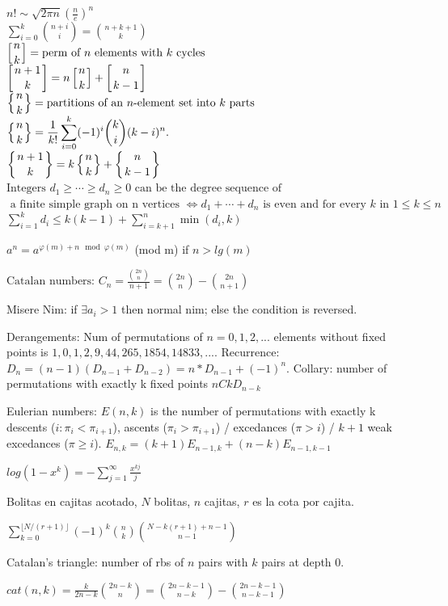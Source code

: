 $\displaystyle n!\sim {\sqrt {2\pi n}}\left({\frac {n}{e}}\right)^{n}$ \\
$\displaystyle \sum \limits_{i= 0}^k{n+i \choose i} = {n+k+1 \choose k}$ \\
${\displaystyle \left[{n \atop k}\right]} =\text{perm of }n \text{ elements with } k \text{ cycles}$ \\
${\displaystyle \left[{n+1 \atop k}\right]=n\left[{n \atop k}\right]+\left[{n \atop k-1}\right]}$ \\
${\displaystyle \left\{{n \atop k}\right\}}= \text{partitions of an }n\text{-element set into } k \text{ parts}$ \\
${\displaystyle \left\{{n \atop k}\right\}={\frac {1}{k!}}\sum _{i=0}^{k}(-1)^{i}{\binom {k}{i}}(k-i)^{n}.}$ \\
${\displaystyle \left\{{n+1 \atop k}\right\}=k\left\{{n \atop k}\right\}+\left\{{n \atop k-1}\right\}}$ \\
$\text {Integers } d_{1}\geq \cdots \geq d_{n} \geq 0 \text { can be the degree sequence of }$ \\
$\text { a finite simple graph on n vertices }\iff d_{1}+\cdots +d_{n} \text { is even and for every } k \text { in } 1\leq k\leq n $ \\
${\displaystyle \sum _{i=1}^{k}d_{i}\leq k(k-1)+\sum _{i=k+1}^{n}\min(d_{i},k)}$

$a^n = a^{\varphi(m)+n \mod \varphi(m)}$ (mod m) if $n > lg(m)$

$\text{Catalan numbers: }C_n=\frac{\binom{2n}{n}}{n+1}=\binom{2n}{n} - \binom{2n}{n+1}$

Misere Nim: if $\exists a_i > 1$ then normal nim; else the condition is reversed.

Derangements: Num of permutations of $n=0,1,2,...$ elements without fixed points is
$1,0,1,2,9,44,265,1854,14833,...$. Recurrence: $D_n = (n-1)(D_{n-1}+D_{n-2}) = n*D_{n-1}+(-1)^n$.
Collary: number of permutations with exactly k fixed points $nCk D_{n-k}$

Eulerian numbers: $E(n,k)$ is the number of permutations with exactly k descents ($i:\pi_{i} < \pi_{i+1}$),
ascents ($\pi_i > \pi_{i+1}$) / excedances ($\pi > i$) / $k+1$ weak excedances ($\pi \geq i$).
$E_{n,k} = (k+1)E_{n-1,k} + (n-k)E_{n-1,k-1}$

$log(1-x^k) = - \sum_{j=1}^{\infty} \frac{x^{kj}}{j}$

Bolitas en cajitas acotado, $N$ bolitas, $n$ cajitas, $r$ es la cota por cajita.

$\sum_{k=0}^{\lfloor N/(r+1) \rfloor} (-1)^k \binom{n}{k} \binom{N - k(r + 1) + n - 1}{n - 1}$

Catalan's triangle: number of rbs of $n$ pairs with $k$ pairs at depth 0.

$cat(n, k) = \frac{k}{2n - k} \binom{2n - k}{n} = \binom{2n - k - 1}{n - k} - \binom{2n - k - 1}{n - k - 1}$